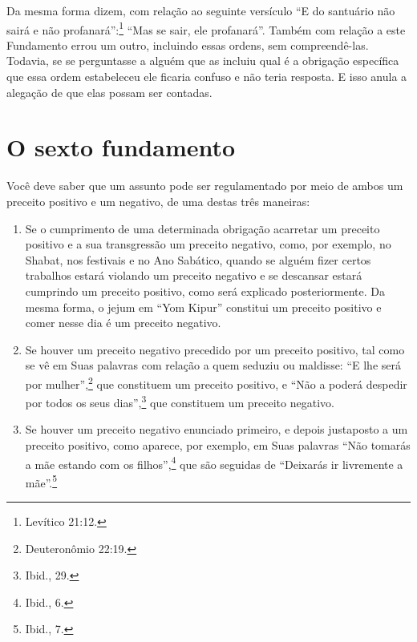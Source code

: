 Da mesma forma dizem, com relação ao seguinte versículo ``E do
santuário não sairá e não profanará'':\footnote{Levítico 21:12.} ``Mas se sair,
ele profanará''.
Também com relação a este Fundamento errou um outro, incluindo essas
ordens, sem compreendê-las. Todavia, se se perguntasse a alguém que as
incluiu qual é a obrigação específica que essa ordem estabeleceu ele
ficaria confuso e não teria resposta. E isso anula a alegação de que
elas possam ser contadas.

\chapter*{O sexto fundamento}

Você deve saber que um assunto pode ser regulamentado por meio de ambos
um preceito positivo e um negativo, de uma destas três maneiras:

\begin{enumerate}
\def\labelenumi{\arabic{enumi}.}
\item
  Se o cumprimento de uma determinada obrigação acarretar um preceito
  positivo e a sua transgressão um preceito negativo, como, por
  exemplo, no Shabat, nos festivais e no Ano Sabático, quando se alguém
  fizer certos trabalhos estará violando um preceito negativo e se
  descansar estará cumprindo um preceito positivo, como será explicado
  posteriormente. Da mesma forma, o jejum em ``Yom Kipur'' constitui um
  preceito positivo e comer nesse dia é um preceito negativo.

\item
  Se houver um preceito negativo precedido por um preceito positivo,
  tal como se vê em Suas palavras com relação a quem seduziu ou
  maldisse: ``E lhe será por mulher'',\footnote{Deuteronômio 22:19.} que
  constituem um preceito positivo, e ``Não a poderá despedir por todos
  os seus dias'',\footnote{Ibid., 29.} que constituem um preceito negativo.

\item
  Se houver um preceito negativo enunciado primeiro, e depois
  justaposto a um preceito positivo, como aparece, por exemplo, em Suas
  palavras ``Não tomarás a mãe estando com os filhos'',\footnote{Ibid., 6.} que
  são seguidas de ``Deixarás ir livremente a mãe''.\footnote{Ibid., 7.}
\end{enumerate}

